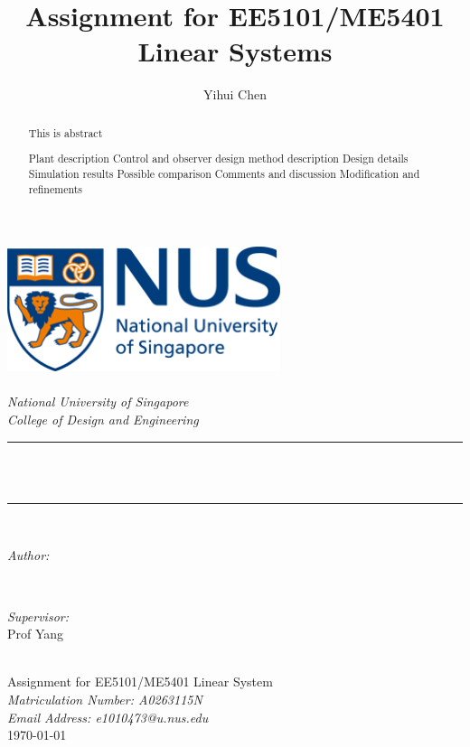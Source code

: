 \documentclass[hyperref]{article}
\title{Assignment for EE5101/ME5401 Linear Systems}
\author{\textup{Yihui Chen}}
\theoremstyle{nonumberplain}
\begin{document}
	\begin{titlepage}
		\center
		\newcommand{\HRule}{\rule{\linewidth}{0.5mm}}
		\includegraphics[width=8cm]{logo.png}\\[1cm] 
		\quad\\[1.5cm]
		\textsl{\Large National University of Singapore}\\[0.5cm] 
		\textsl{\large College of Design and Engineering}\\[0.5cm]
		\makeatletter
		\HRule \\[0.4cm]
		{ \huge \bfseries \@title}\\[0.4cm] 
		\HRule \\[1.5cm]
		\begin{minipage}{0.4\textwidth}
			\begin{flushleft} \large
				\emph{Author:}\\
				\@author 
			\end{flushleft}
		\end{minipage}
		~
		\begin{minipage}{0.4\textwidth}
			\begin{flushright} \large
				\emph{Supervisor:} \\
				\textup{Prof Yang}
			\end{flushright}
		\end{minipage}\\[3cm]
		\makeatother
		{\Large Assignment for EE5101/ME5401 Linear System}\\[0.5cm]
		{\large \emph{Matriculation Number: A0263115N}}\\[0.5cm]
		{\large \emph{Email Address: e1010473@u.nus.edu}}\\[0.5cm]
		{\large \today}\\[2cm] 
		\vfill 
	\end{titlepage}
	

	\begin{abstract}
		
	This is abstract
	
	Plant description
	Control and observer design method description
	Design details
	Simulation results
	Possible comparison
	Comments and discussion
	Modification and refinements
	
	\end{abstract}
	
\end{document}
